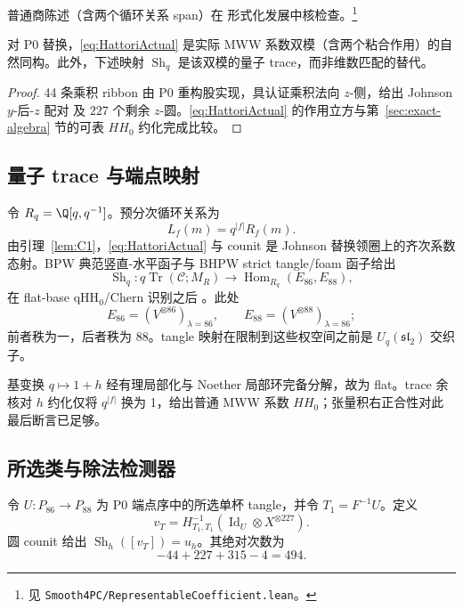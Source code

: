 普通商陈述（含两个循环关系 span）在
形式化发展中核检查。\footnote{见
\texttt{Smooth4PC/RepresentableCoefficient.lean}。}

\begin{lemma}[实际系数双模]\label{lem:C1}
对 P0 替换，\eqref{eq:HattoriActual} 是实际 MWW 系数双模（含两个粘合作用）的自然同构。此外，下述映射 \(\operatorname{Sh}_q\) 是该双模的量子 trace，而非维数匹配的替代。
\end{lemma}

\begin{proof}
44 条乘积 ribbon 由 P0 重构股实现，具认证乘积法向 $z$-侧，给出 Johnson $y$-后-$z$ 配对
及 $227$ 个剩余 $z$-圆。\eqref{eq:HattoriActual} 的作用立方与第~\ref{sec:exact-algebra} 节的可表 $HH_0$ 约化完成比较。
\end{proof}

\subsection{量子 trace 与端点映射}

令 $R_q=\Q[q,q^{-1}]$。预分次循环关系为
\[
L_f(m)=q^{|f|}R_f(m).
\]
由引理~\ref{lem:C1}，\eqref{eq:HattoriActual} 与 counit 是 Johnson 替换领圈上的齐次系数态射。BPW 典范竖直-水平函子与 BHPW strict tangle/foam 函子给出
\begin{equation}\label{eq:actualShadow}
\operatorname{Sh}_q:q\operatorname{Tr}(\mathcal C;M_R)
\longrightarrow\operatorname{Hom}_{R_q}(E_{86},E_{88}),
\end{equation}
在 flat-base qHH$_0$/Chern 识别之后
\cite{BeliakovaPutyraWehrli2019,BeliakovaHogancampPutyraWehrli2023}。此处
\[
E_{86}=(V^{\otimes86})_{\lambda=86},\qquad
E_{88}=(V^{\otimes88})_{\lambda=86};
\]
前者秩为一，后者秩为 88。tangle 映射在限制到这些权空间之前是 $U_q(\mathfrak{sl}_2)$ 交织子。

基变换 $q\mapsto1+h$ 经有理局部化与 Noether 局部环完备分解，故为 flat。trace 余核对 $h$ 约化仅将 $q^{|f|}$ 换为 1，给出普通 MWW 系数 $HH_0$；张量积右正合性对此最后断言已足够。

\subsection{所选类与除法检测器}

令 $U:P_{86}\to P_{88}$ 为 P0 端点序中的所选单杯 tangle，并令 $T_1=F^{-1}U$。定义
\[
v_T=H_{T_1,T_1}^{-1}
  (\operatorname{Id}_U\otimes X^{\otimes227}).
\]
圆 counit 给出
$\operatorname{Sh}_h([v_T])=u_h$。其绝对次数为
\[
-44+227+315-4=494.
\]

